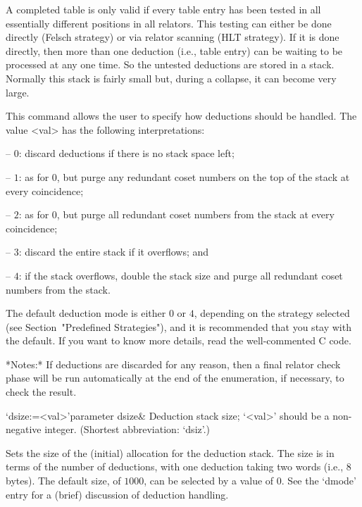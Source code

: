 A completed table  is only valid if every table  entry has been tested
in all essentially different  positions in all relators.  This testing
can either be done directly  (Felsch strategy) or via relator scanning
(HLT strategy).  If it is  done directly, then more than one deduction
(i.e., table  entry) can be waiting  to be processed at  any one time.
So the untested deductions are stored in a stack.  Normally this stack
is fairly small but, during a collapse, it can become very large.

This  command allows  the user  to  specify how  deductions should  be
handled.  The value <val> has the following interpretations:


\beginlist

\item{--} $0$:  
discard deductions if there is no stack space left;

\item{--} $1$: 
as for $0$, but purge any redundant coset numbers on the top of the stack
at every coincidence;

\item{--} $2$: 
as for 0, but  purge all redundant coset numbers from the stack at
every coincidence;

\item{--} $3$:
discard the entire stack if it overflows; and

\item{--} $4$:
if  the stack  overflows,  double the  stack size  and  purge all
redundant coset numbers from the stack.

\endlist

The  default deduction mode  is either  $0$ or  $4$, depending  on the
strategy  selected (see  Section~"Predefined Strategies"),  and  it is
recommended that you stay with the  default.  If you want to know more
details, read the well-commented C code.

*Notes:*
If deductions are discarded for any reason, then a final relator check
phase  will be run  automatically at  the end  of the  enumeration, if
necessary, to check the result.

\>`dsize:=<val>'{parameter dsize}&
Deduction stack size; `<val>' should be a non-negative integer.
(Shortest abbreviation: `dsiz'.)

Sets the  size of  the (initial) allocation  for the  deduction stack.
The size is  in terms of the number of  deductions, with one deduction
taking two words (i.e., 8 bytes).  The default size, of $1000$, can be
selected  by  a value  of  0.   See the  `dmode' entry  for a  (brief)
discussion of deduction handling.

